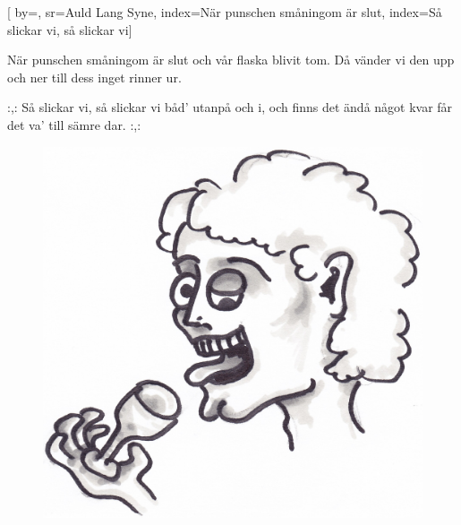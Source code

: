 

[ 		%
	by={},					%
	sr={Auld Lang Syne},					%
	index={När punschen småningom är slut}, %
	index={Så slickar vi, så slickar vi}]						%
	

\beginverse*						%
När punschen småningom är slut
och vår flaska blivit tom.
Då vänder vi den upp och ner
till dess inget rinner ur.
\endverse							%

\beginchorus						%
:,: Så slickar vi, så slickar vi
båd' utanpå och i,
och finns det ändå något kvar
får det va' till sämre dar. :,:
\endchorus

\endsong							%

\begin{figure}[!b]
 \begin{center}
\includegraphics[scale=.3]{../bilder/sistapunschvisan.jpg} 
\end{center}
\end{figure}